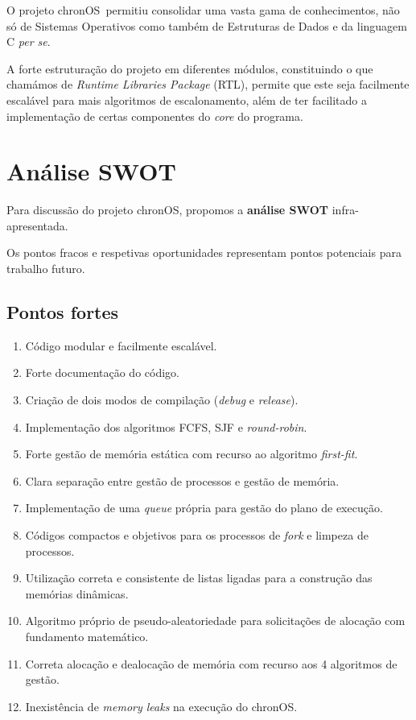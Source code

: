 \documentclass[10pt,oneside]{estiloUBI}
\newcommand{\chronOS}{\textsf{chronOS}}
\begin{document}
	O projeto \chronOS~permitiu consolidar uma vasta gama de conhecimentos, não só de Sistemas Operativos como também de Estruturas de Dados e da linguagem C \textit{per se}.
	
	A forte estruturação do projeto em diferentes módulos, constituindo o que chamámos de \textit{Runtime Libraries Package} (RTL), permite que este seja facilmente escalável para mais algoritmos de escalonamento, além de ter facilitado a implementação de certas componentes do \textit{core} do programa.
	
	
	\section{Análise SWOT}
	
	Para discussão do projeto \chronOS, propomos a \textbf{análise SWOT} infra-apresentada.
	
	Os pontos fracos e respetivas oportunidades representam pontos potenciais para trabalho futuro.
	
	\subsection{Pontos fortes}
	
	\begin{enumerate}
		\item Código modular e facilmente escalável.
		\item Forte documentação do código.
		\item Criação de dois modos de compilação (\textit{debug} e \textit{release}).
		\item Implementação dos algoritmos \ac{FCFS}, \ac{SJF} e \textit{round-robin}.
		\item Forte gestão de memória estática com recurso ao algoritmo \textit{first-fit}.
		\item Clara separação entre gestão de processos e gestão de memória.
		\item Implementação de uma \textit{queue} própria para gestão do plano de execução.
		\item Códigos compactos e objetivos para os processos de \textit{fork} e limpeza de processos.
		\item Utilização correta e consistente de listas ligadas para a construção das memórias dinâmicas.
		\item Algoritmo próprio de pseudo-aleatoriedade para solicitações de alocação com fundamento matemático.
		\item Correta alocação e dealocação de memória com recurso aos 4 algoritmos de gestão.
		\item Inexistência de \textit{memory leaks} na execução do \chronOS.
	\end{enumerate}
	
\end{document}
